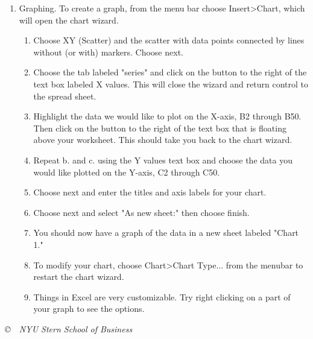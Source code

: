 \documentclass[letterpaper,12pt]{article}
\begin{document}
\begin{enumerate}
\item  Graphing.  To create a graph, from the menu bar choose Insert>Chart, which will open the chart wizard.  
\begin{enumerate}    
\item  Choose XY (Scatter) and the scatter with data points connected by lines without (or with) markers.  Choose next.
\item  Choose the tab labeled "series" and click on the button to the right of the text box labeled X values.  This will close the wizard and return control to the spread sheet. 
\item Highlight the data we would like to plot on the X-axis, B2 through B50.  Then click on the button to the right of the text box that is floating above your worksheet.  This should take you back to the chart wizard.  
\item  Repeat b. and c. using the Y values text box and choose the data you would like plotted on the Y-axis, C2 through C50.
\item Choose next and enter the titles and axis labels for your chart.
\item Choose next and select "As new sheet:" then choose finish.
\item You should now have a graph of the data in a new sheet labeled "Chart 1."
\item To modify your chart, choose Chart>Chart Type... from the menubar to restart the chart wizard.
\item Things in Excel are very customizable.  Try right clicking on a part of your graph to see the options.
\end{enumerate}
\end{enumerate}

\vfill \centerline{\it \copyright \ \number\year \ NYU Stern
School of Business}
\end{document}

